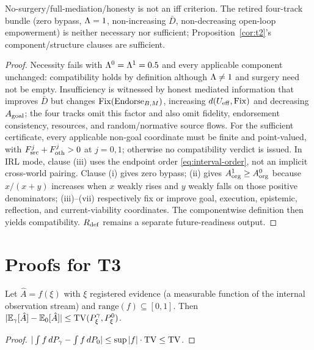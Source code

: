 \begin{proposition}
No-surgery/full-mediation/honesty is not an iff criterion. The retired
four-track bundle (zero bypass, $\Lambda=1$, non-increasing $\bar D$,
non-decreasing open-loop empowerment) is neither necessary nor sufficient;
Proposition~\ref{cor:t2}'s component/structure clauses are sufficient.
\end{proposition}
\begin{proof}
Necessity fails with $\Lambda^0=\Lambda^1=0.5$ and every applicable component
unchanged: compatibility holds by definition although $\Lambda\ne1$ and surgery
need not be empty. Insufficiency is witnessed by honest mediated information
that improves $\bar D$ but changes $\mathrm{Fix}(\mathrm{Endorse}_{B,M})$, increasing
$d(U_{\mathrm{eff}},\mathrm{Fix})$ and decreasing $A_{\mathrm{goal}}$; the four tracks omit this factor and
also omit fidelity, endorsement consistency, resources, and random/normative
source flows. For the sufficient certificate, every applicable non-goal
coordinate must be finite and point-valued, with $F_{\mathrm{src}}^j+F_{\mathrm{oth}}^j>0$ at
$j=0,1$; otherwise no compatibility verdict is issued. In IRL mode, clause
(iii) uses the endpoint order \eqref{eq:interval-order}, not an implicit
cross-world pairing. Clause (i) gives zero bypass; (ii)
gives $A_{\mathrm{org}}^1\ge A_{\mathrm{org}}^0$ because $x/(x+y)$ increases when $x$ weakly rises
and $y$ weakly falls on those positive denominators; (iii)--(vii) respectively fix or improve goal,
execution, epistemic, reflection, and current-viability coordinates. The
componentwise definition then yields compatibility. $R_{\mathrm{def}}$ remains a
separate future-readiness output.
\end{proof}

\section{Proofs for T3}\label{app:t3}

\begin{lemma}\label{lem:tv-continuity}
Let $\hat A=f(\xi)$ with $\xi$ registered evidence (a measurable function of
the internal observation stream) and $\mathrm{range}(f)\subseteq[0,1]$. Then
$|\mathbb{E}_\gamma[\hat A]-\mathbb{E}_0[\hat A]|\le
\mathrm{TV}(P_\xi^\gamma,P_\xi^0)$.
\end{lemma}
\begin{proof}
$|\int f\,dP_\gamma-\int f\,dP_0|\le\sup|f|\cdot\mathrm{TV}\le\mathrm{TV}$.
\end{proof}

